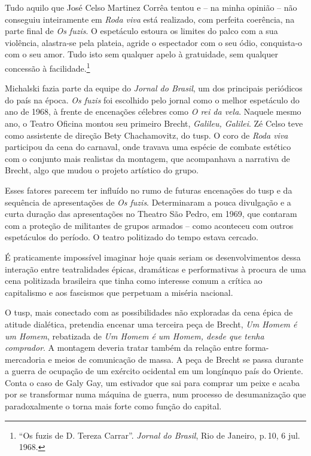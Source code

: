 \startblockquote
Tudo aquilo que José Celso Martinez Corrêa tentou e -- na minha opinião
-- não conseguiu inteiramente em {\it Roda viva} está realizado, com
perfeita coerência, na parte final de {\it Os fuzis}. O espetáculo
estoura os limites do palco com a sua violência, alastra-se pela
plateia, agride o espectador com o seu ódio, conquista-o com o seu amor.
Tudo isto sem qualquer apelo à gratuidade, sem qualquer concessão à
facilidade.\footnote{“Os fuzis de D. Tereza Carrar”. {\it Jornal do
  Brasil}, Rio de Janeiro, p.\,10, 6 jul. 1968.}
\stopblockquote


Michalski fazia parte da equipe do {\it Jornal do Brasil}, um dos
principais periódicos do país na época. {\it Os fuzis} foi escolhido
pelo jornal como o melhor espetáculo do ano de 1968, à frente de
encenações célebres como {\it O rei da vela}. Naquele mesmo ano, o
Teatro Oficina montou seu primeiro Brecht, {\it Galileu, Galilei}. Zé
Celso teve como assistente de direção Bety Chachamovitz, do {\sc tusp}. O coro
de {\it Roda viva} participou da cena do carnaval, onde travava uma
espécie de combate estético com o conjunto mais realistas da montagem,
que acompanhava a narrativa de Brecht, algo que mudou o projeto
artístico do grupo.

Esses fatores parecem ter influído no rumo de futuras encenações do {\sc tusp}
e da sequência de apresentações de {\it Os fuzis}. Determinaram a pouca
divulgação e a curta duração das apresentações no Theatro São Pedro, em
1969, que contaram com a proteção de militantes de grupos armados -- como
aconteceu com outros espetáculos do período. O teatro politizado do
tempo estava cercado.

É praticamente impossível imaginar hoje quais seriam os desenvolvimentos
dessa interação entre teatralidades épicas, dramáticas e performativas à
procura de uma cena politizada brasileira que tinha como interesse comum
a crítica ao capitalismo e aos fascismos que perpetuam a miséria
nacional.

O {\sc tusp}, mais conectado com as possibilidades não exploradas da cena
épica de atitude dialética, pretendia encenar uma terceira peça de
Brecht, {\it Um Homem é um Homem}, rebatizada de {\it Um Homem é um
Homem, desde que tenha comprador}. A montagem deveria tratar também da
relação entre forma-mercadoria e meios de comunicação de massa. A peça
de Brecht se passa durante a guerra de ocupação de um exército ocidental
em um longínquo país do Oriente. Conta o caso de Galy Gay, um estivador
que sai para comprar um peixe e acaba por se transformar numa máquina de
guerra, num processo de desumanização que paradoxalmente o torna mais
forte como função do capital.

